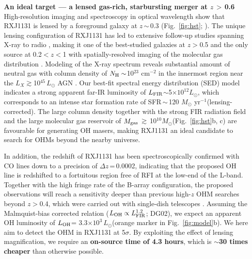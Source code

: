 \documentclass[letterpaper,11pt]{article}
\newcommand{\Lsun}{\mbox{$L_{\odot}$}\xspace}
\newcommand{\Msun}{\mbox{$M_{\odot}$}\xspace}
\newcommand{\LFIR}{\mbox{$L_{\rm FIR}$}\xspace}
\newcommand{\LOH}{$L_{\rm OH}$\xspace}
\newcommand{\pmOne}{\mbox{$^{-1}$}\xspace}
\newcommand{\Fig}[1]{Fig.~\ref{fig:#1}}
\newcommand{\E}[1]{\mbox{$\times10^{#1}$}}
\newcommand{\eq}{\,=\,}
\newcommand{\ssim}{\,$\sim$\,}
\newcommand{\obs}{observations\xspace}
\begin{document}
\noindent \textbf{An ideal target --- a lensed gas-rich, starbursting merger at $z$\,$>$\,0.6}\\
\noindent High-resolution imaging and spectroscopy in optical wavelength show that RXJ1131 is
lensed by a foreground galaxy at $z$\ssim0.3 (\Fig{hst}; \citealt{Sluse03a}).
The unique lensing configuration of RXJ1131 has led to extensive follow-up studies spanning X-ray to radio \citep[\Fig{hst}e; e.g.,][]{Claeskens06a, Sluse07a, Leung17a},
making it one of the best-studied galaxies at $z$$>$0.5 and
the only source at 0.2$<$$z$$<$1 with spatially-resolved imaging of the molecular gas distribution \citep{Leung17a}.
Modeling of the X-ray spectrum reveals substantial amount of neutral gas with column density of
$N_{\rm H}\sim$10$^{23}$ cm$^{-2}$ in the innermost region near %
the $L_X$$\gtrsim$10$^{45}$\,\Lsun AGN \citep{Pooley07a, Reis14a}.
Our best-fit spectral energy distribution (SED) model indicates
a strong apparent far-IR luminosity of \LFIR$\sim$5\E{12}\Lsun, which corresponds to
an intense star formation rate of SFR\ssim120 \Msun yr\pmOne (lensing-corrected).
The large column density together with the strong FIR radiation field %
and the large molecular gas reservoir of $M_{\rm gas}$\,$\gtrsim$\,10$^{10}$\Msun (\Fig{hst}b, c)
are favourable for generating OH masers, making RXJ1131 an ideal candidate
to search for OHMs beyond the nearby universe. 

\noindent In addition, the redshift of RXJ1131 has been spectroscopically confirmed with CO lines down to a precision of
$\Delta z$\eq0.0002, indicating that the proposed OH line is redshifted to a fortuitous region
free of RFI at the low-end of the L-band.
Together with the high fringe rate of the B-array configuration, the proposed \obs will
reach a sensitivity deeper than previous high-$z$ OHM searches beyond $z$$>$0.4, which were carried out
with single-dish telescopes \citep[\Fig{model}b; e.g.][]{Darling02a, Willett12a}.
Assuming the Malmquist-bias corrected relation
($L_{\rm OH}\propto L_{\rm FIR}^{1.2}$; DG02), we expect an apparent OH luminosity of \LOH= 3.3\E{3}\,\Lsun (orange marker in \Fig{model}b). 
We here aim to detect the OHM in RXJ1131 at 5$\sigma$. 
By exploiting the effect of lensing magnification, we require an {\bf on-source time of 4.3 hours}, which
is {\bf $\sim$30 times cheaper}
than otherwise possible.
\end{document}
